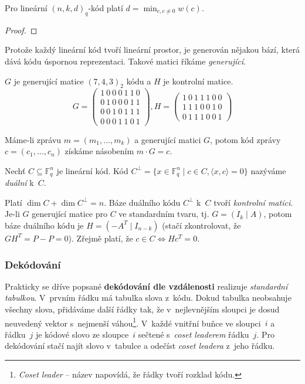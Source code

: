 \begin{claim}
Pro lineární $(n,k,d)_q$-kód platí $d = \min_{c, c \neq 0} w(c)$.
\end{claim}

\begin{proof}
\end{proof}

Protože každý lineární kód tvoří lineární prostor, je generován nějakou
bází, která dává kódu úspornou reprezentaci. Takové matici říkáme
{\em generující}.

\begin{example}
    $G$ je generující matice $(7,4,3)_2$ kódu
    a $H$ je kontrolní matice.
\[
G =
\begin{pmatrix}
    1\ 0\ 0\ 0\ 1\ 1\ 0 \\
    0\ 1\ 0\ 0\ 0\ 1\ 1 \\
    0\ 0\ 1\ 0\ 1\ 1\ 1 \\
    0\ 0\ 0\ 1\ 1\ 0\ 1
\end{pmatrix},
H =
\begin{pmatrix}
    1\ 0\ 1\ 1\ 1\ 0\ 0 \\
    1\ 1\ 1\ 0\ 0\ 1\ 0 \\
    0\ 1\ 1\ 1\ 0\ 0\ 1
\end{pmatrix}
\]

\end{example}

Máme-li zprávu $m = (m_1,\ldots,m_k)$ a generující matici $G$,
potom kód zprávy $c = (c_1, \ldots, c_n)$
získáme násobením $m \cdot G = c$.

\begin{definition}
    Nechť $C \subseteq \mathbb{F}^n_q$ je lineární kód.
    Kód $C^\bot = \{ x \in \mathbb{F}^n_q \mid c \in C, \langle x,c \rangle = 0 \}$
    nazýváme {\em duální} k~$C$.
\end{definition}

Platí $\dim C + \dim C^\bot = n$.
Báze duálního kódu $C^\bot$ k~$C$ tvoří {\em kontrolní matici}.
Je-li $G$ generující matice pro $C$ ve standardním tvaru, tj.
$G = (I_k \mid A)$, potom báze duálního kódu je $H = (-A^T \mid I_{n - k})$
(stačí zkontrolovat, že $GH^T = P - P = 0$).
Zřejmě platí, že $c \in C \iff Hc^T = 0$.


\subsubsection{Dekódování}

Prakticky se dříve popsané {\bf dekódování dle vzdálenosti} realizuje
{\em standardní tabulkou}. V~prvním řádku má tabulka slova z~kódu. Dokud
tabulka neobsahuje všechny slova, přidáváme další řádky tak, že
v~nejlevnějším sloupci je dosud neuvedený vektor s~nejmenší
váhou\footnote{{\em Coset leader} -- název napovídá, že řádky tvoří
rozklad kódu.}. V~každé vnitřní buňce ve sloupci~$i$ a řádku~$j$ je
kódové slovo ze sloupce~$i$ sečtené s~{\em coset leaderem} řádku~$j$.
Pro dekódování stačí najít slovo v~tabulce a odečíst {\em coset leadera}
z~jeho řádku.

